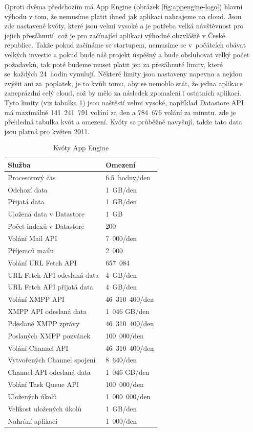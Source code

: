 Oproti dvěma předchozím má App Engine (obrázek \ref{fig:appengine-logo}) hlavní výhodu v tom, že nemusíme platit ihned jak aplikaci nahrajeme na cloud. Jsou zde nastavené kvóty, které jsou velmi vysoké a je potřeba velká návštěvnost pro jejich přesáhnutí, což je pro začínající aplikaci výhodné obzvláště v České republice. Takže pokud začínáme se startupem, nemusíme se v~počátcích obávat velkých investic a pokud bude náš projekt úspěšný a bude obsluhovat velký počet požadavků, tak poté budeme muset platit jen za přesáhnuté limity, které se~každých 24~hodin vynulují. Některé limity jsou nastaveny napevno a nejdou zvýšit ani za~poplatek, je to kvůli tomu, aby se nemohlo stát, že jedna aplikace zaneprázdní celý cloud, což by mělo za následek zpomalení i ostatních aplikací. Tyto limity (viz tabulka \ref{tab:quotas}) jsou naštěstí velmi vysoké, například Datastore API má maximálně 141~241~791 volání za den a 784~676 volání za minutu.  zde je přehledná tabulka kvót a omezení. Kvóty se průběžně navyšují, takže tato data jsou  platná pro květen 2011.

\begin{table}[h]
\centering
\caption{Kvóty App Engine}\label{tab:quotas}
\begin{tabular}{|l|l|}
   \hline
     Služba & Omezení \\
   \hline
    Procesorový čas & 6.5~hodny/den \\
    Odchozí data & 1~GB/den \\
    Přijatá data &1~GB/den \\
    Uložená data v Datastore & 1~GB \\
    Počet indexů v Datastore & 200 \\
    Volání Mail API & 7~000/den \\ 
    Příjemců mailu & 2~000 \\
    Volání URL Fetch API & 657~084 \\
    URL Fetch API odeslaná data  & 4~GB/den \\
    URL Fetch API přijatá data  & 4~GB/den \\
    Volání XMPP API & 46~310~400/den \\
    XMPP API odeslaná data & 1~046 GB/den \\
    Pdeslané XMPP zprávy & 46~310~400/den \\
    Poslaných XMPP pozvánek & 100~000/den \\
    Volání Channel API & 46~310~400/den \\
    Vytvořených Channel spojení & 8~640/den \\
    Channel API odeslaná data & 1~046  GB/den \\
    Volání Task Queue API & 100~000/den \\
    Uložených úkolů & 1~000~000/den \\
    Velikost uložených úkolů & 1~GB/den \\
    Nahrání aplikací & 1~000/den \\
   \hline
\end{tabular}
\end{table}

